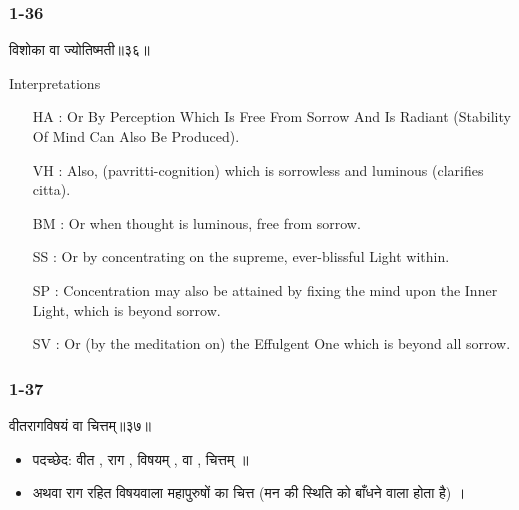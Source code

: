 \begin{frame}[fragile]\frametitle{1-36}
\begin{sanskrit}
विशोका वा ज्योतिष्मती॥३६॥
\end{sanskrit}

Interpretations
\begin{itemize}	
\item [HA]: Or By Perception Which Is Free From Sorrow And Is Radiant (Stability Of Mind Can Also Be Produced).
\item [VH]: Also, (pavritti-cognition) which is sorrowless and luminous (clarifies citta).
\item [BM]: Or when thought is luminous, free from sorrow.
\item [SS]: Or by concentrating on the supreme, ever-blissful Light within.
\item [SP]: Concentration may also be attained by fixing the mind upon the Inner Light, which is beyond sorrow.
\item [SV]: Or (by the meditation on) the Effulgent One which is beyond all sorrow. 
\end{itemize}
	
\end{frame}

\begin{frame}[fragile]\frametitle{1-37}
\begin{sanskrit}
वीतरागविषयं वा चित्तम्॥३७॥
\end{sanskrit}

\begin{itemize}
\item पदच्छेद: वीत , राग , विषयम् , वा , चित्तम् ॥
\item अथवा राग रहित विषयवाला महापुरुषों का चित्त (मन की स्थिति को बाँधने वाला होता है) ।
\end{itemize}
	
\end{frame}


